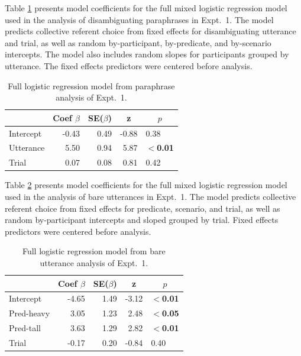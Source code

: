 \documentclass[linguex]{sp}
\begin{document}
Table \ref{expt1analysis1} presents model coefficients for the full mixed logistic regression model used in the analysis of disambiguating paraphrases in Expt.~1. The model predicts collective referent choice from fixed effects for disambiguating utterance and trial, as well as random by-participant, by-predicate, and by-scenario intercepts. The model also includes random slopes for participants grouped by utterance. The fixed effects predictors were centered before analysis.

\begin{table}[h!] 
	\centering \caption{Full logistic regression model from paraphrase analysis of Expt.~1.} \label{expt1analysis1}
\begin{tabular}{lrrrl}\toprule
	&	Coef $\beta$	&	SE($\beta$)	&	\multicolumn{1}{c}{ \textbf{z}}	&	\multicolumn{1}{c}{$p$}\\ \midrule
Intercept	&	-0.43	&	0.49	&	-0.88	&	0.38\\
Utterance	&	5.50	&	0.94	&	5.87	&	\textbf{$<$0.01}\\
Trial	&	0.07	&	0.08	&	0.81	&	0.42\\
\bottomrule
\end{tabular}
\end{table}

Table \ref{expt1analysis2} presents model coefficients for the full mixed logistic regression model used in the analysis of bare utterances in Expt.~1. The model predicts collective referent choice from fixed effects for predicate, scenario, and trial, as well as random by-participant intercepts and sloped grouped by trial. Fixed effects predictors were centered before analysis.


\begin{table}[h!] 
	\centering \caption{Full logistic regression model from bare utterance analysis of Expt.~1.} \label{expt1analysis2}
	\begin{tabular}{lrrrl}\toprule
		&	Coef $\beta$	&	SE($\beta$)	&	\multicolumn{1}{c}{ \textbf{z}}	&	\multicolumn{1}{c}{$p$}\\ \midrule
		Intercept	&	-4.65	&	1.49	&	-3.12	&	\textbf{$<$0.01}\\
		Pred-heavy	&	3.05	&	1.23	&	2.48	&	\textbf{$<$0.05}\\
		Pred-tall	&	3.63	&	1.29	&	2.82	&	\textbf{$<$0.01}\\
		Trial	&	-0.17	&	0.20	&	-0.84	&	0.40\\
		\bottomrule
	\end{tabular}
\end{table}
 
\end{document}
